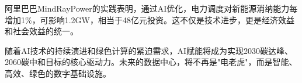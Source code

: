 阿里巴巴MindRayPower的实践表明，通过AI优化，电力调度对新能源消纳能力每增加1\%，可影响1.2GW，相当于48亿元投资。这不仅是技术进步，更是经济效益和社会效益的统一。

随着AI技术的持续演进和绿色计算的紧迫需求，AI赋能将成为实现2030碳达峰、2060碳中和目标的核心驱动力。未来的数据中心，将不再是"电老虎"，而是智能、高效、绿色的数字基础设施。

